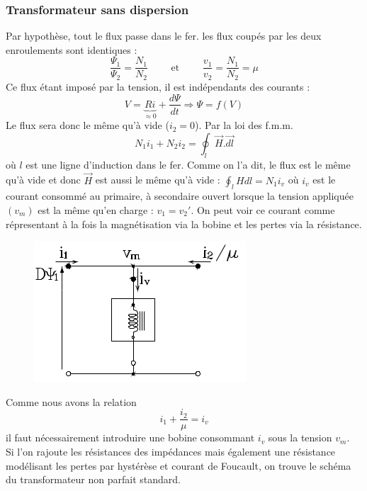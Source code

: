 		\subsubsection{Transformateur sans dispersion}
		Par hypothèse, tout le flux passe dans le fer. les flux coupés par les deux 
		enroulements sont identiques :
		\begin{equation}
		\frac{\Psi_1}{\Psi_2} = \frac{N_1}{N_2}\qquad\text{ et }\qquad \frac{v_1}{
		v_2}=\frac{N_1}{N_2} = \mu
		\end{equation}
		Ce flux étant imposé par la tension, il est indépendants des courants :
		\begin{equation}
		V = \underbrace{Ri}_{\approx0} + \dfrac{d\Psi}{dt} \Rightarrow \Psi = f(V)
		\end{equation}				
		Le flux sera donc le même qu'à vide ($i_2 = 0$).
		Par la loi des f.m.m.
		\begin{equation}
		N_1i_1 + N_2i_2 = \oint_l \vec{H}.\vec{dl}
		\end{equation}
		où $l$ est une ligne d'induction dans le fer. Comme on l'a dit, le flux est le 
		même qu'à vide et donc $\vec{H}$ est aussi le même 
		qu'à vide : $\oint_l Hdl = N_1i_v$ où $i_v$ est le courant consommé 
		au primaire, à secondaire ouvert lorsque la tension appliquée $(v_m)$ est 
		la même qu'en charge : $v_1=v_2'$. On peut voir ce courant comme répresentant à 
		la fois la magnétisation via la bobine et les pertes via la résistance.\\
		\begin{figure}
		\vspace{-8mm}
		\includegraphics[scale=0.4]{ch3/imager1.png}
		\end{figure}
		Comme nous avons la relation
		\begin{equation}
		i_1 + \frac{i_2}{\mu} = i_v
		\end{equation}
		il faut nécessairement introduire une bobine consommant $i_v$ sous la 
		tension $v_m$. 	\\
		Si l'on rajoute les résistances des impédances mais également une résistance 
		modélisant les pertes par hystérèse et courant de Foucault, on trouve le 
		schéma du transformateur non parfait standard.
	
